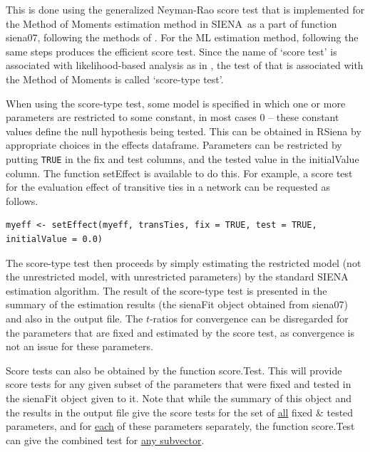 \documentclass[a4paper,fleqn,11pt]{article}
\newcommand{\+}{\, + \,}
\newcommand{\sfn}[1]{\textsf{#1}}
\newcommand{\RS}{{\sf \textsf{RSiena} }}
\newcommand{\SI}{{\sf SIENA }}
\newcommand{\si}{{\sf SIENA}}
\begin{document}
This is done using the generalized Neyman-Rao score test
that is implemented for the Method of Moments estimation method
 in \si\ as a part of function \textsf{siena07}, following the methods
of \citet{Schweinberger12}.
For the ML estimation method,
following the same steps produces the \citet{Rao47} efficient score test.
Since the name of `score test' is associated with
likelihood-based analysis as in \citet{Rao47}, the test
of  \citet{Schweinberger12} that is associated with the Method of Moments
is called `score-type test'.

When using the score-type test, some model
is specified in which one or more parameters are restricted to some
constant, in most cases $0$ -- these constant values
define the null hypothesis being tested.
This can be obtained in \RS by appropriate choices in the effects dataframe.
Parameters can be restricted by
putting \texttt{TRUE} in the \sfn{fix} and \sfn{test} columns, and
the tested value in the \sfn{initialValue} column.
The function \textsf{setEffect} is available to do this.
For example, a score test for the evaluation effect of transitive ties
in a network can be requested as follows.
\begin{verbatim}
myeff <- setEffect(myeff, transTies, fix = TRUE, test = TRUE, initialValue = 0.0)
\end{verbatim}

The score-type test then
proceeds by simply estimating the restricted model (not the unrestricted model,
with unrestricted parameters) by the standard \SI estimation algorithm.
The result of the score-type test is presented in the \sfn{summary}
of the estimation results (the \sfn{sienaFit} object obtained from
\sfn{siena07}) and also in the output file.
The $t$-ratios for convergence can be disregarded for the parameters
that are fixed and estimated by the score test, as convergence is not an issue
for these parameters.

Score tests can also be obtained by the function \sfn{score.Test}.
This will provide score tests for any given subset of the parameters
that were fixed and tested in the \sfn{sienaFit} object given to it.
Note that while the  \sfn{summary} of this object and the results
in the output file give the score tests for the set of \underline{all}
fixed \& tested parameters, and for \underline{each} of these parameters
separately, the function \sfn{score.Test} can give the combined test
for \underline{any subvector}.
\end{document}
